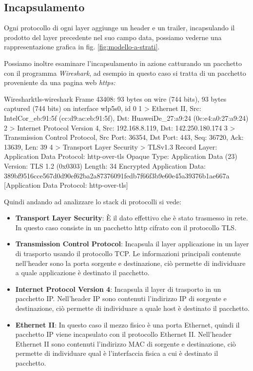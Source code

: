 \subsection{Incapsulamento \ok}

Ogni protocollo di ogni layer aggiunge un header e un trailer, incapsulando il prodotto del layer precedente nel suo campo data, possiamo vederne una rappresentazione grafica in fig. \ref{fig:modello-a-strati}.

Possiamo inoltre esaminare l'incapsulamento in azione catturando un pacchetto con il programma \textit{Wireshark}, ad esempio in questo caso si tratta di un pacchetto proveniente da una pagina web \it{https}:

\begin{bashcode}{Wireshark}{tls-wireshark}
Frame 43408: 93 bytes on wire (744 bits), 93 bytes captured (744 bits) on interface wlp5s0, id 0
1 > Ethernet II, Src: IntelCor_eb:91:5f (cc:d9:ac:eb:91:5f), Dst: HuaweiDe_27:a9:24 (0c:e4:a0:27:a9:24)
2 > Internet Protocol Version 4, Src: 192.168.8.119, Dst: 142.250.180.174
3 > Transmission Control Protocol, Src Port: 36354, Dst Port: 443, Seq: 36720, Ack: 13639, Len: 39
4 > Transport Layer Security
> TLSv1.3 Record Layer: Application Data Protocol: http-over-tls
Opaque Type: Application Data (23)
Version: TLS 1.2 (0x0303)
Length: 34
Encrypted Application Data: 389bf9516cce567d0d90ef62ba2a87376091fedb7f66f3b9e60e45a39376b1ae667a
    [Application Data Protocol: http-over-tls]
\end{bashcode}

Quindi andando ad analizzare lo stack di protocolli si vede:

\begin{itemize}
    \item \textbf{Transport Layer Security}\cite{RFC_8446}: È il dato effettivo che è stato trasmesso in rete. In questo caso consiste in un pacchetto http cifrato con il protocollo TLS.

    \item \textbf{Transmission Control Protocol}\cite{RFC_0793}: Incapsula il layer applicazione in un layer di trasporto usando il protocollo TCP. Le informazioni principali contenute nell'header sono la porta sorgente e destinazione, ciò permette di individuare a quale applicazione è destinato il pacchetto.
    
    \item \textbf{Internet Protocol Version 4}\cite{RFC_0791}: Incapsula il layer di trasporto in un pacchetto IP. Nell'header IP sono contenuti l'indirizzo IP di sorgente e destinazione, ciò permette di individuare a quale host è destinato il pacchetto.
    
    \item \textbf{Ethernet II}\cite{ethernet-ii}: In questo caso il mezzo fisico è una porta Ethernet, quindi il pacchetto IP viene incapsulato con il protocollo Ethernet II. Nell'header Ethernet II sono contenuti l'indirizzo MAC di sorgente e destinazione, ciò permette di individuare qual è l'interfaccia fisica a cui è destinato il pacchetto.
\end{itemize}

